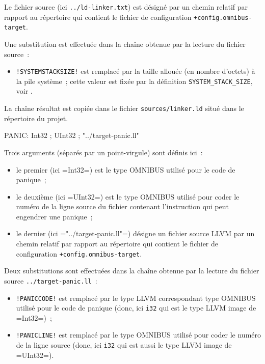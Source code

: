 Le fichier source (ici \texttt{../ld-linker.txt}) est désigné par un chemin relatif par rapport au répertoire qui contient le fichier de configuration \texttt{+config.omnibus-target}.

Une substitution est effectuée dans la chaîne obtenue par la lecture du fichier source~:
\begin{itemize}
  \item \texttt{!SYSTEMSTACKSIZE!} est remplacé par la taille allouée (en nombre d'octets) à la pile système~; cette valeur est fixée par la définition \texttt{SYSTEM\_STACK\_SIZE}, voir .
\end{itemize}

La chaîne résultat est copiée dans le fichier \texttt{sources/linker.ld} situé dans le répertoire du projet.












\begin{OMNIBUS}
PANIC:
  Int32 ; UInt32 ; "../target-panic.ll"
\end{OMNIBUS}

Trois arguments (séparés par un point-virgule) sont définis ici~:
\begin{itemize}
  \item le premier (ici \omnibus=Int32=) est le type OMNIBUS utilisé pour le code de panique~;
  \item le deuxième (ici \omnibus=UInt32=) est le type OMNIBUS utilisé pour coder le numéro de la ligne source du fichier contenant l'instruction qui peut engendrer une panique~;
  \item le dernier (ici \omnibus="../target-panic.ll"=) désigne un fichier source LLVM par un chemin relatif par rapport au répertoire qui contient le fichier de configuration \texttt{+config.omnibus-target}.
\end{itemize}

Deux substitutions sont effectuées dans la chaîne obtenue par la lecture du fichier source \texttt{../target-panic.ll}~:
\begin{itemize}
  \item \texttt{!PANICCODE!} est remplacé par le type LLVM correspondant type OMNIBUS utilisé pour le code de panique (donc, ici \texttt{i32} qui est le type LLVM image de \omnibus=Int32=)~;
  \item \texttt{!PANICLINE!} est remplacé par le type OMNIBUS utilisé pour coder le numéro de la ligne source  (donc, ici \texttt{i32} qui est aussi le type LLVM image de \omnibus=UInt32=).
\end{itemize}


